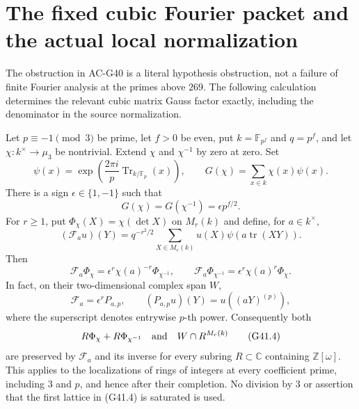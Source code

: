 \section{The fixed cubic Fourier packet and the actual local normalization}
\label{sec:cubic-local-fourier}

The obstruction in AC-G40 is a literal hypothesis obstruction, not a
failure of finite Fourier analysis at the primes above $269$.  The
following calculation determines the relevant cubic matrix Gauss
factor exactly, including the denominator in the source normalization.

\begin{theorem}
\label{AC-G41}
Let $p\equiv-1\pmod3$ be prime, let $f>0$ be even, put
$k=\mathbb F_{p^f}$ and $q=p^f$, and let
$\chi:k^\times\longrightarrow\mu_3$ be nontrivial.  Extend
$\chi$ and $\chi^{-1}$ by zero at zero.  Set
\[
 \psi(x)=\exp\!\left(\frac{2\pi i}{p}
                 \operatorname{Tr}_{k/\mathbb F_p}(x)\right),
 \qquad
 G(\chi)=\sum_{x\in k}\chi(x)\psi(x).
\]
There is a sign $\epsilon\in\{1,-1\}$ such that
\[
 G(\chi)=G(\chi^{-1})=\epsilon p^{f/2}.                 \tag{G41.1}
\]
For $r\geq1$, put $\Phi_\chi(X)=\chi(\det X)$ on
$M_r(k)$ and define, for $a\in k^\times$,
\[
 (\mathcal F_a u)(Y)=q^{-r^2/2}
          \sum_{X\in M_r(k)}u(X)\psi(a\operatorname{tr}(XY)).
\]
Then
\[
 \mathcal F_a\Phi_\chi
       =\epsilon^r\chi(a)^{-r}\Phi_{\chi^{-1}},
 \qquad
 \mathcal F_a\Phi_{\chi^{-1}}
       =\epsilon^r\chi(a)^r\Phi_\chi.                  \tag{G41.2}
\]
In fact, on their two-dimensional complex span $W$,
\[
       \mathcal F_a=\epsilon^r P_{a,p},\qquad
       (P_{a,p}u)(Y)=u((aY)^{(p)}),                    \tag{G41.3}
\]
where the superscript denotes entrywise $p$-th power.
Consequently both
\[
 R\Phi_\chi+R\Phi_{\chi^{-1}}
 \quad\hbox{and}\quad W\cap R^{M_r(k)}
                                                               \tag{G41.4}
\]
are preserved by $\mathcal F_a$ and its inverse for every subring
$R\subset\mathbb C$ containing $\mathbb Z[\omega]$.
This applies to the localizations of rings of integers at every
coefficient prime, including $3$ and $p$, and hence after their
completion.  No division by $3$ or assertion that the first lattice
in (G41.4) is saturated is used.
\end{theorem}

